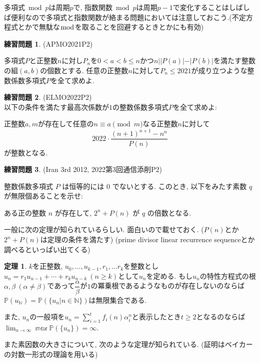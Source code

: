 \documentclass{ltjsarticle}
\theoremstyle{definition}
\newtheorem{thm}{定理}
\newtheorem{prob}{練習問題}
\begin{document}
多項式$\bmod p$は周期$p$で, 指数関数$\bmod p$は周期$p-1$で変化することはしばしば便利なので多項式と指数関数が絡まる問題においては注意しておこう.(不定方程式とかで無駄な$\bmod$を取ることを回避するときとかにも有効)

\begin{prob}(APMO2021P2)

多項式$P$と正整数$n$に対し$P_n$を$0<a<b\leq n$かつ$n||P(a)|-|P(b)|$を満たす整数の組$(a,b)$の個数とする. 任意の正整数$n$に対して$P_n\leq2021$が成り立つような整数係数多項式$P$を全て求めよ.
\end{prob}

\begin{prob}(ELMO2022P2)\\
以下の条件を満たす最高次係数が$1$の整数係数多項式$P$を全て求めよ:

正整数$a,m$が存在して任意の$n\equiv a\pmod m$なる正整数$n$に対して$$2022\cdot\frac{(n+1)^{n+1}-n^n}{P(n)}$$が整数となる.
\end{prob}

\begin{prob}(Iran 3rd 2012, 2022第3回通信添削P2)

整数係数多項式 $P$ は恒等的には $0$ でないとする. このとき, 以下をみたす素数 $q$
が無限個あることを示せ:
\begin{center}
ある正の整数 $n$ が存在して, $2^n + P(n)$ が $q$ の倍数となる.
\end{center}

\end{prob}

一般に次の定理が知られているらしい. 面白いので載せておく. ($P(n)$とか$2^n+P(n)$は定理の条件を満たす) (prime divisor linear recurrence sequenceとか調べるといっぱい出てくる)
\begin{thm}
$k$を正整数, $u_0,...,u_{k-1},r_1,...r_k$を整数とし$u_n=r_1u_{n-1}+ \cdots + 
r_ku_{n-k}\ (n\geq k)$として$u_n$を定める. もし$u_n$の特性方程式の根$\alpha,\beta\ (\alpha\neq \beta)$であって$\dfrac{\alpha}{\beta}$が$1$の冪乗根であるようなものが存在しないのならば$\mathbb P(u_{\mathbb N})=\mathbb P(\{u_n|n\in \mathbb N\})$は無限集合である.

また, $u_n$の一般項を$u_n=\displaystyle\sum_{i=1}^t f_i(n)\alpha_i^{n}$と表示したとき$t\geq2$となるのならば$\displaystyle\lim_{n\to \infty}\mathbb \max \mathbb P(\{u_n\})=\infty$.
\end{thm}

また素因数の大きさについて, 次のような定理が知られている. (証明はベイカーの対数一形式の理論を用いる)
\end{document}
